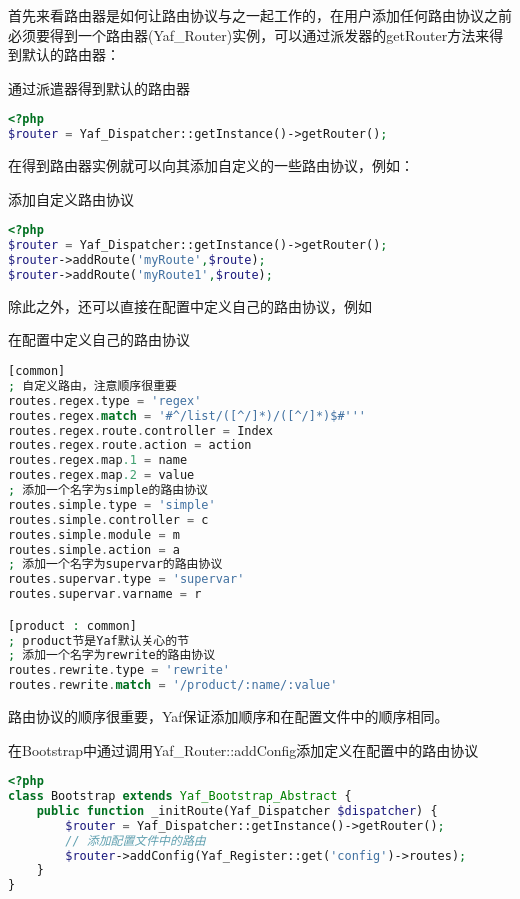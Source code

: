 首先来看路由器是如何让路由协议与之一起工作的，在用户添加任何路由协议之前必须要得到一个路由器(Yaf\_Router)实例，可以通过派发器的getRouter方法来得到默认的路由器：





\begin{example}
通过派遣器得到默认的路由器
\begin{lstlisting}[language=PHP]
<?php
$router = Yaf_Dispatcher::getInstance()->getRouter();
\end{lstlisting}
\end{example}


在得到路由器实例就可以向其添加自定义的一些路由协议，例如：

\begin{example}
添加自定义路由协议
\begin{lstlisting}[language=PHP]
<?php
$router = Yaf_Dispatcher::getInstance()->getRouter();
$router->addRoute('myRoute',$route);
$router->addRoute('myRoute1',$route);
\end{lstlisting}
\end{example}

除此之外，还可以直接在配置中定义自己的路由协议，例如



\begin{example}
在配置中定义自己的路由协议
\begin{lstlisting}[language=PHP]
[common]
; 自定义路由，注意顺序很重要
routes.regex.type = 'regex'
routes.regex.match = '#^/list/([^/]*)/([^/]*)$#'''
routes.regex.route.controller = Index
routes.regex.route.action = action
routes.regex.map.1 = name
routes.regex.map.2 = value
; 添加一个名字为simple的路由协议
routes.simple.type = 'simple'
routes.simple.controller = c
routes.simple.module = m
routes.simple.action = a
; 添加一个名字为supervar的路由协议
routes.supervar.type = 'supervar'
routes.supervar.varname = r

[product : common]
; product节是Yaf默认关心的节
; 添加一个名字为rewrite的路由协议
routes.rewrite.type = 'rewrite'
routes.rewrite.match = '/product/:name/:value'
\end{lstlisting}
\end{example}

路由协议的顺序很重要，Yaf保证添加顺序和在配置文件中的顺序相同。



\begin{example}
在Bootstrap中通过调用Yaf\_Router::addConfig添加定义在配置中的路由协议
\begin{lstlisting}[language=PHP]
<?php
class Bootstrap extends Yaf_Bootstrap_Abstract {
    public function _initRoute(Yaf_Dispatcher $dispatcher) {
        $router = Yaf_Dispatcher::getInstance()->getRouter();
        // 添加配置文件中的路由
        $router->addConfig(Yaf_Register::get('config')->routes);
    }
}
\end{lstlisting}
\end{example}

